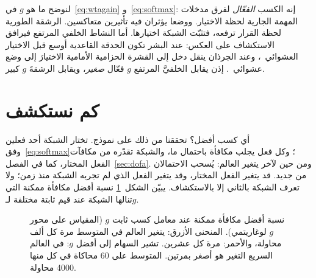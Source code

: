 لنوضح ما هو $g$ في~\eqref{eq:wtagain} و~\eqref{eq:softmax}: إنه الكسب \emph{الفعّال} لفرق مدخلات المهمة الجارية لحظة الاختيار. ووضعا  يؤثران فيه تأثيرين متعاكسين. الرشقة الطورية لحظة القرار ترفعه، فتثبّت الشبكة اختيارها. أما النشاط الخلفي المرتفع فيرافق الاستكشاف على العكس: عند البشر تكون الحدقة القاعدية أوسع قبل الاختيار العشوائي~\cite{JepmaNieuwenhuis2011}، وعند الجرذان ينقل دخل  إلى القشرة الحزامية الأمامية الاختيارَ إلى وضع عشوائي~\cite{Tervo2014stochastic}. إذن يقابل  الخلفيَّ المرتفع $g$ فعّال \emph{صغير}، ويقابل الرشقةَ $g$ كبير.

\section{كم نستكشف}

أي كسب أفضل؟ تحققنا من ذلك على نموذج. تختار الشبكة أحد فعلين وفق~\eqref{eq:softmax}؛ وكل فعل يجلب مكافأة باحتمال ما، والشبكة تقدّره من مكافآت الفعل المختار، كما في الفصل~\ref{sec:dofa}. ومن حين لآخر يتغير العالم: يُسحب الاحتمالان من جديد. قد يتغير الفعل المختار، وقد يتغير الفعل الذي لم تجربه الشبكة منذ زمن؛ ولا تعرف الشبكة بالثاني إلا بالاستكشاف. يبيّن الشكل~\ref{fig:invertedU} نسبة أفضل مكافأة ممكنة التي تنالها الشبكة عند قيم ثابتة مختلفة لـ$g$.

\begin{figure}[t]
\centering
{}
\caption{نسبة أفضل مكافأة ممكنة عند معامل كسب ثابت $g$ (المقياس على محور $g$ لوغاريتمي). المنحنى الأزرق: يتغير العالم في المتوسط مرة كل ألف محاولة، والأحمر: مرة كل عشرين. تشير السهام إلى أفضل $g$: في العالم السريع التغير هو أصغر بمرتين. المتوسط على 60 محاكاة في كل منها 4000 محاولة.}
\label{fig:invertedU}
\end{figure}

